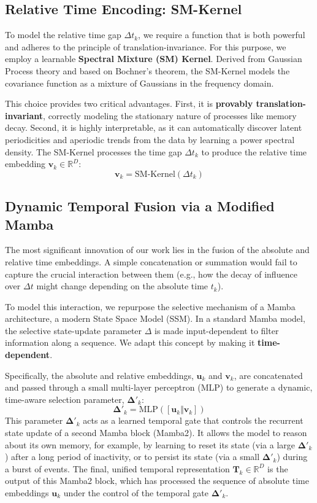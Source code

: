 \documentclass{article}
\begin{document}
\subsection{Relative Time Encoding: SM-Kernel}
To model the relative time gap $\Delta t_k$, we require a function that is both powerful and adheres to the principle of translation-invariance. For this purpose, we employ a learnable \textbf{Spectral Mixture (SM) Kernel}. Derived from Gaussian Process theory and based on Bochner's theorem, the SM-Kernel models the covariance function as a mixture of Gaussians in the frequency domain.

This choice provides two critical advantages. First, it is \textbf{provably translation-invariant}, correctly modeling the stationary nature of processes like memory decay. Second, it is highly interpretable, as it can automatically discover latent periodicities and aperiodic trends from the data by learning a power spectral density. The SM-Kernel processes the time gap $\Delta t_k$ to produce the relative time embedding $\mathbf{v}_k \in \mathbb{R}^D$:
\begin{equation}
    \mathbf{v}_k = \text{SM-Kernel}(\Delta t_k)
\end{equation}

\subsection{Dynamic Temporal Fusion via a Modified Mamba}
The most significant innovation of our work lies in the fusion of the absolute and relative time embeddings. A simple concatenation or summation would fail to capture the crucial interaction between them (e.g., how the decay of influence over $\Delta t$ might change depending on the absolute time $t_k$).

To model this interaction, we repurpose the selective mechanism of a Mamba architecture, a modern State Space Model (SSM). In a standard Mamba model, the selective state-update parameter $\Delta$ is made input-dependent to filter information along a sequence. We adapt this concept by making it \textbf{time-dependent}.

Specifically, the absolute and relative embeddings, $\mathbf{u}_k$ and $\mathbf{v}_k$, are concatenated and passed through a small multi-layer perceptron (MLP) to generate a dynamic, time-aware selection parameter, $\mathbf{\Delta'}_k$:
\begin{equation}
    \mathbf{\Delta'}_k = \text{MLP}([\mathbf{u}_k \Vert \mathbf{v}_k])
\end{equation}
This parameter $\mathbf{\Delta'}_k$ acts as a learned temporal gate that controls the recurrent state update of a second Mamba block (Mamba2). It allows the model to reason about its own memory, for example, by learning to reset its state (via a large $\mathbf{\Delta'}_k$) after a long period of inactivity, or to persist its state (via a small $\mathbf{\Delta'}_k$) during a burst of events. The final, unified temporal representation $\mathbf{T}_k \in \mathbb{R}^D$ is the output of this Mamba2 block, which has processed the sequence of absolute time embeddings $\mathbf{u}_k$ under the control of the temporal gate $\mathbf{\Delta'}_k$.
\end{document}
